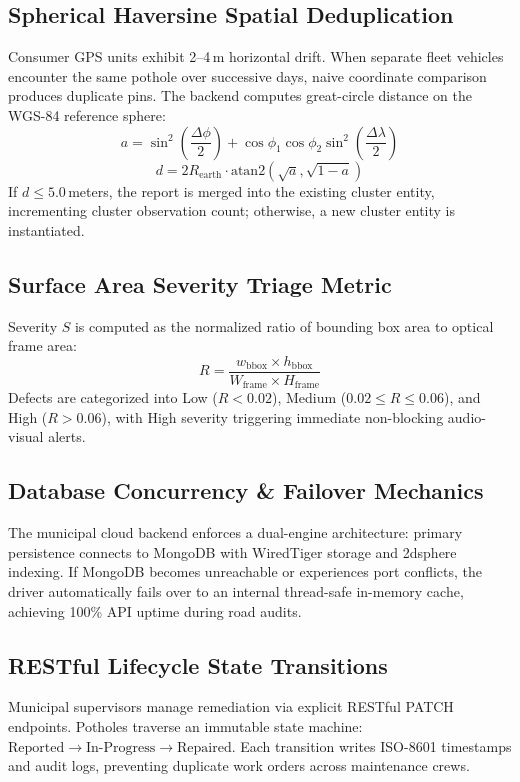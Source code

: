 \documentclass[conference]{IEEEtran}
\begin{document}
\subsection{Spherical Haversine Spatial Deduplication}
Consumer GPS units exhibit 2--4\,m horizontal drift. When separate fleet vehicles encounter the same pothole over successive days, naive coordinate comparison produces duplicate pins. The backend computes great-circle distance on the WGS-84 reference sphere:
\begin{equation}
a = \sin^2\left(\frac{\Delta\phi}{2}\right) + \cos\phi_1\cos\phi_2\sin^2\left(\frac{\Delta\lambda}{2}\right)
\end{equation}
\begin{equation}
d = 2 R_{\text{earth}} \cdot \text{atan2}(\sqrt{a}, \sqrt{1 - a})
\end{equation}
If $d \le 5.0$\,meters, the report is merged into the existing cluster entity, incrementing cluster observation count; otherwise, a new cluster entity is instantiated.

\subsection{Surface Area Severity Triage Metric}
Severity $S$ is computed as the normalized ratio of bounding box area to optical frame area:
\begin{equation}
R = \frac{w_{\text{bbox}} \times h_{\text{bbox}}}{W_{\text{frame}} \times H_{\text{frame}}}
\end{equation}
Defects are categorized into Low ($R < 0.02$), Medium ($0.02 \le R \le 0.06$), and High ($R > 0.06$), with High severity triggering immediate non-blocking audio-visual alerts.

\subsection{Database Concurrency \& Failover Mechanics}
The municipal cloud backend enforces a dual-engine architecture: primary persistence connects to MongoDB with WiredTiger storage and 2dsphere indexing. If MongoDB becomes unreachable or experiences port conflicts, the driver automatically fails over to an internal thread-safe in-memory cache, achieving 100\% API uptime during road audits.

\subsection{RESTful Lifecycle State Transitions}
Municipal supervisors manage remediation via explicit RESTful PATCH endpoints. Potholes traverse an immutable state machine: $\text{Reported} \to \text{In-Progress} \to \text{Repaired}$. Each transition writes ISO-8601 timestamps and audit logs, preventing duplicate work orders across maintenance crews.
\end{document}
